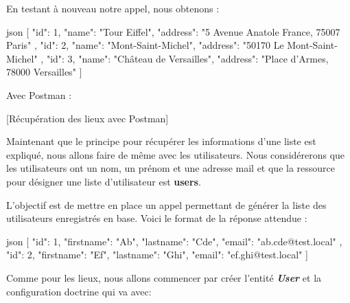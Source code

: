 \documentclass[big]{zmdocument}
\begin{document}
En testant à nouveau notre appel, nous obtenons :



\begin{CodeBlock}{json}
[
  {
    "id": 1,
    "name": "Tour Eiffel",
    "address": "5 Avenue Anatole France, 75007 Paris"
  },
  {
    "id": 2,
    "name": "Mont-Saint-Michel",
    "address": "50170 Le Mont-Saint-Michel"
  },
  {
    "id": 3,
    "name": "Château de Versailles",
    "address": "Place d'Armes, 78000 Versailles"
  }
]
\end{CodeBlock}



Avec Postman :



[Récupération des lieux avec Postman]






Maintenant que le principe pour récupérer les informations d'une liste est expliqué, nous allons faire de même avec les utilisateurs. 
Nous considérerons que les utilisateurs ont un nom, un prénom et une adresse mail et que la ressource pour désigner une liste d'utilisateur est \textbf{users}.



L'objectif est de mettre en place un appel permettant de générer la liste des utilisateurs enregistrés en base.
Voici le format de la réponse attendue :



\begin{CodeBlock}{json}
[
  {
    "id": 1,
    "firstname": "Ab",
    "lastname": "Cde",
    "email": "ab.cde@test.local"
  },
  {
    "id": 2,
    "firstname": "Ef",
    "lastname": "Ghi",
    "email": "ef.ghi@test.local"
  }
]
\end{CodeBlock}







Comme pour les lieux, nous allons commencer par créer l'entité \textbf{\textit{User}} et la configuration doctrine qui va avec:
\end{document}
